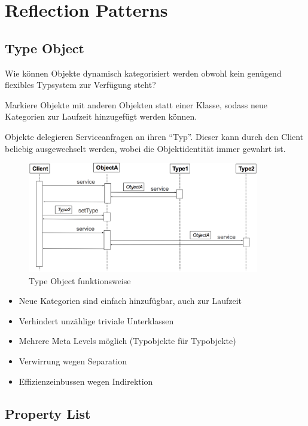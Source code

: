 \section{Reflection Patterns}

\subsection{Type Object}

Wie können Objekte dynamisch kategorisiert werden obwohl kein genügend flexibles Typsystem zur Verfügung steht?

Markiere Objekte mit anderen Objekten statt einer Klasse, sodass neue Kategorien zur Laufzeit hinzugefügt werden können.

Objekte delegieren Serviceanfragen an ihren ``Typ''. Dieser kann durch den Client beliebig ausgewechselt werden, wobei die Objektidentität immer gewahrt ist.

\begin{figure}[H]
	\centering
	\includegraphics[width=0.9\textwidth]{content/advancedPatterns/typeobject.png}
	\caption{Type Object funktionsweise}
\end{figure}

\begin{itemize}
	\item Neue Kategorien sind einfach hinzufügbar, auch zur Laufzeit
	\item Verhindert unzählige triviale Unterklassen
	\item Mehrere Meta Levels möglich (Typobjekte für Typobjekte)
	\item Verwirrung wegen Separation
	\item Effizienzeinbussen wegen Indirektion
\end{itemize}

\subsection{Property List}

